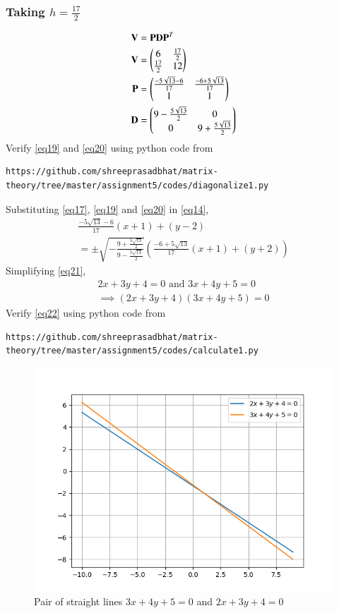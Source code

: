 \documentclass[journal,12pt,twocolumn]{IEEEtran}
\begin{document}
\subsubsection{Taking $h=\frac{17}{2}$}
\begin{align}
	\mathbf{V} &= \mathbf{P}\mathbf{D}\mathbf{P}^T\\
	\label{eq18}\mathbf{V} &= \begin{pmatrix} 6 & \frac{17}{2}\\ \frac{17}{2} & 12\end{pmatrix}\\
	\label{eq19}\mathbf{P} &= \begin{pmatrix}\frac{-5\sqrt{13} - 6}{17} & \frac{-6 + 5\sqrt{13}}{17}\\ 1 & 1\end{pmatrix}\\
	\label{eq20}\mathbf{D} &= \begin{pmatrix}9 - \frac{5\sqrt{13}}{2} & 0\\ 0 & 9 + \frac{5\sqrt{13}}{2}\end{pmatrix}
\end{align}
Verify  \eqref{eq19} and \eqref{eq20} using python code from
\begin{lstlisting}
https://github.com/shreeprasadbhat/matrix-theory/tree/master/assignment5/codes/diagonalize1.py
\end{lstlisting}
Substituting \eqref{eq17}, \eqref{eq19} and \eqref{eq20} in \eqref{eq14},
\begin{multline}\label{eq21}
	\frac{-5\sqrt{13} - 6}{17}(x+1) + (y-2) \\= \pm \sqrt{-\frac{9 + \frac{5\sqrt{13}}{2}}{9 - \frac{5\sqrt{13}}{2}}}\left(\frac{-6 + 5\sqrt{13}}{17}(x+1) + (y+2)\right)
\end{multline}
Simplifying \eqref{eq21},
\begin{align}
	\label{eq22}2x + 3y + 4 = 0 \text{ and } 3x + 4y + 5 = 0\\
	\implies (2x + 3y + 4)(3x + 4y + 5) = 0
\end{align}
Verify  \eqref{eq22} using python code from
\begin{lstlisting}
https://github.com/shreeprasadbhat/matrix-theory/tree/master/assignment5/codes/calculate1.py
\end{lstlisting}
\renewcommand{\thefigure}{1}
\begin{figure}[h]
	\centering
	\includegraphics[width=\columnwidth]{fig/figure_1.png}
	\caption{Pair of straight lines $3x + 4y + 5 = 0$ and $2x + 3y + 4 = 0$}
	\label{fig:figure1}
\end{figure}
\end{document}
